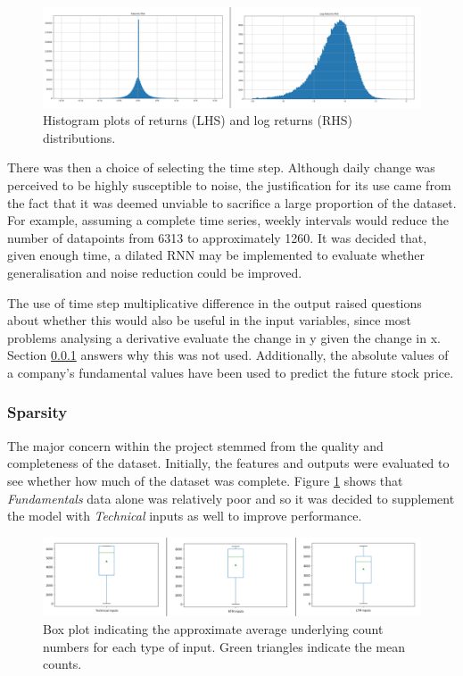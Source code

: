 \documentclass[10pt,onecolumn,letterpaper]{article}
\begin{document}
\begin{figure}[!hbt!]
\centering
\includegraphics[width=\columnwidth]{returns_distribution.png}
\caption{Histogram plots of returns (LHS) and log returns (RHS) distributions.}
\end{figure}

There was then a choice of selecting the time step. Although daily change was perceived to be highly susceptible to noise, the justification for its use came from the fact that it was deemed unviable to sacrifice a large proportion of the dataset. For example, assuming a complete time series, weekly intervals would reduce the number of datapoints from 6313 to approximately 1260. It was decided that, given enough time, a dilated RNN may be implemented to evaluate whether generalisation and noise reduction could be improved. 

The use of time step multiplicative difference in the output raised questions about whether this would also be useful in the input variables, since most problems analysing a derivative evaluate the change in y given the change in x. Section \ref{data_analysis} answers why this was not used. Additionally, the absolute values of a company's fundamental values have been used to predict the future stock price.

\subsubsection{Sparsity} \label{data_analysis}

The major concern within the project stemmed from the quality and completeness of the dataset. Initially, the features and outputs were evaluated to see whether how much of the dataset was complete. Figure \ref{input_counts} shows that \textit{Fundamentals} data alone was relatively poor and so it was decided to supplement the model with \textit{Technical} inputs as well to improve performance. 

\begin{figure}[!hbt!]
\centering
\includegraphics[width=\columnwidth]{input_counts.png}
\caption{Box plot indicating the approximate average underlying count numbers for each type of input. Green triangles indicate the mean counts.}
\label{input_counts}
\end{figure}
\end{document}
